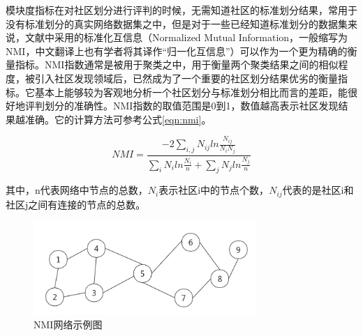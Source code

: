 模块度指标在对社区划分进行评判的时候，无需知道社区的标准划分结果，常用于没有标准划分的真实网络数据集之中，但是对于一些已经知道标准划分的数据集来说，文献\cite{Peng2014Weighting}中采用的标准化互信息（Normalized Mutual Information，一般缩写为NMI，中文翻译上也有学者将其译作“归一化互信息”）可以作为一个更为精确的衡量指标。NMI指数通常是被用于聚类之中，用于衡量两个聚类结果之间的相似程度，被引入社区发现领域后，已然成为了一个重要的社区划分结果优劣的衡量指标。它基本上能够较为客观地分析一个社区划分与标准划分相比而言的差距，能很好地评判划分的准确性。NMI指数的取值范围是0到1，数值越高表示社区发现结果越准确。它的计算方法可参考公式\ref{eqn:nmi}。

\begin{equation}
  \label{eqn:nmi}
  NMI=\frac{ -2 \sum_{i,j} N_{ij}  ln{\frac{N_{ij}}{N_iN_j}} } {\sum_{i}N_iln{\frac{N_i}{n}}+\sum_{j}N_jln{\frac{N_j}{n}}}
\end{equation}

其中，n代表网络中节点的总数，$N_i$表示社区i中的节点个数，$N_{ij}$代表的是社区i和社区j之间有连接的节点的总数。

\begin{figure}
 \centering
 \includegraphics[width=0.75\textwidth]{figures/fig5-1}
 \caption{NMI网络示例图}\label{fig:fig5-1}
\end{figure}

